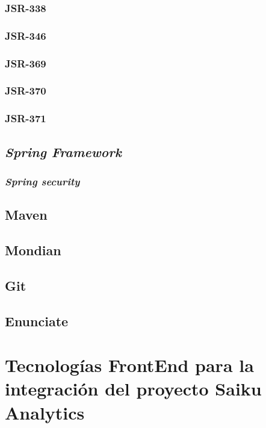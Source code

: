 \begin{spacing}{1.5}
		\subsubsection{JSR-338}
				\lipsum[1-2]
		\subsubsection{JSR-346}
				\lipsum[1-2]
		\subsubsection{JSR-369}
				\lipsum[1-2]
		\subsubsection{JSR-370}
		\lipsum[1-2]
		\subsubsection{JSR-371}
		\lipsum[1-2]
	\subsection{\textit{Spring Framework}}
			\lipsum[1-2]
		\subsubsection{\textit{Spring security}}
				\lipsum[1-2]
	\subsection{Maven}
			\lipsum[1-2]
	\subsection{Mondian}
			\lipsum[1-2]
	\subsection{Git}
			\lipsum[1-2]
	\subsection{Enunciate}
			\lipsum[1-2]
\section{Tecnolog\'{i}as FrontEnd para la integraci\'{o}n
		 del proyecto Saiku Analytics}
		\lipsum[1-2]

\end{spacing}
